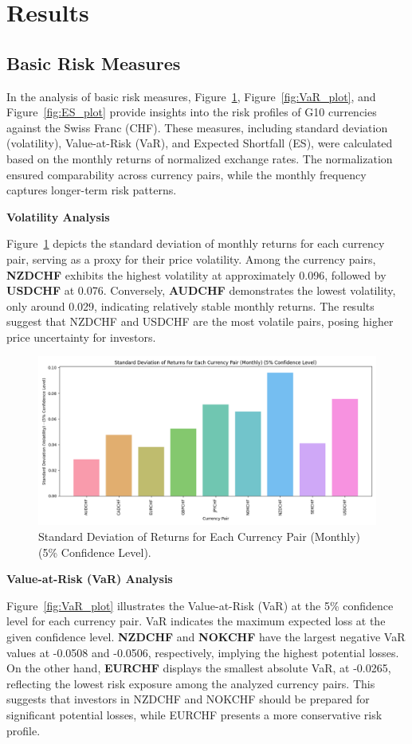 \documentclass{article}
\begin{document}
\section{Results}
\subsection{Basic Risk Measures}

In the analysis of basic risk measures, Figure~\ref{fig:volatility_plot}, Figure~\ref{fig:VaR_plot}, and Figure~\ref{fig:ES_plot} provide insights into the risk profiles of G10 currencies against the Swiss Franc (CHF). These measures, including standard deviation (volatility), Value-at-Risk (VaR), and Expected Shortfall (ES), were calculated based on the monthly returns of normalized exchange rates. The normalization ensured comparability across currency pairs, while the monthly frequency captures longer-term risk patterns.

\textbf{Volatility Analysis}

Figure~\ref{fig:volatility_plot} depicts the standard deviation of monthly returns for each currency pair, serving as a proxy for their price volatility. Among the currency pairs, \textbf{NZDCHF} exhibits the highest volatility at approximately 0.096, followed by \textbf{USDCHF} at 0.076. Conversely, \textbf{AUDCHF} demonstrates the lowest volatility, only around 0.029, indicating relatively stable monthly returns. The results suggest that NZDCHF and USDCHF are the most volatile pairs, posing higher price uncertainty for investors.

\begin{figure}[H]
    \centering
    \includegraphics[width=0.75\linewidth]{reports/figures/volatility_plot.png}
    \caption{Standard Deviation of Returns for Each Currency Pair (Monthly) (5\% Confidence Level).}
    \label{fig:volatility_plot}
\end{figure}

\textbf{Value-at-Risk (VaR) Analysis}

Figure~\ref{fig:VaR_plot} illustrates the Value-at-Risk (VaR) at the 5\% confidence level for each currency pair. VaR indicates the maximum expected loss at the given confidence level. \textbf{NZDCHF} and \textbf{NOKCHF} have the largest negative VaR values at -0.0508 and -0.0506, respectively, implying the highest potential losses. On the other hand, \textbf{EURCHF} displays the smallest absolute VaR, at -0.0265, reflecting the lowest risk exposure among the analyzed currency pairs. This suggests that investors in NZDCHF and NOKCHF should be prepared for significant potential losses, while EURCHF presents a more conservative risk profile.
\end{document}

